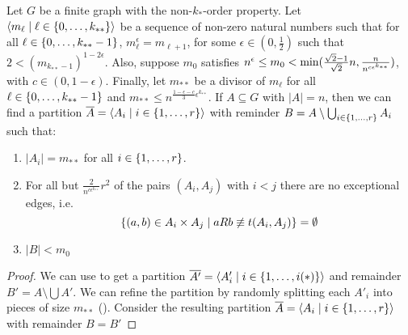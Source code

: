     \begin{lemma}[Claim 4.14] \label{lem:existance_of_equitative_partition_with_bound_exceptional_pairs}
        Let $G$ be a finite graph with the non-$k_{*}$-order property.
        Let $\left< m_\ell \mid \ell \in \{ 0, \dots, k_{**} \} \right>$ be a sequence of non-zero natural numbers such that
        for all $\ell \in \{ 0, \dots, k_{**}-1 \}$, $m_\ell^\epsilon = m_{\ell+1}$,
        for some $\epsilon \in (0, \frac{1}{2})$ such that $2 < (m_{k_{**}-1})^{1-2\epsilon}$.
        Also, suppose $m_0$ satisfies $n^\epsilon \leq m_0 < \min ( \frac{\sqrt{2}-1}{\sqrt{2}} n, \frac{n}{n^{c \epsilon^{k_{**}}}} )$,
        with $c \in (0, 1-\epsilon)$.
        Finally, let $m_{**}$ be a divisor of $m_\ell$ for all $\ell \in \{ 0, \dots, k_{**}-1 \}$ and
        $m_{**} \leq n^{\frac{1 - \epsilon - c}{3}\epsilon^{k_{**}}}$.
        If $A \subseteq G$ with $|A| = n$, then we can find a partition $\overline{A} = \left< A_i \mid i \in \{ 1, \dots, r \} \right>$
        with reminder $B = A \setminus \bigcup_{i \in \{ 1, \dots, r \}} A_i$ such that:
        \begin{enumerate}
            \item \label{itm:existance_of_equitative_partition_with_bound_exceptional_pairs.1} $|A_i| = m_{**}$ for all $i \in \{ 1, \dots, r \}$.
            \item \label{itm:existance_of_equitative_partition_with_bound_exceptional_pairs.2} For all but $\frac{2}{n^{c\epsilon^{k_{**}}}}r^2$ of the pairs
                $(A_i, A_j)$ with $i<j$ there are no exceptional edges, i.e.
                \[
                    \{ (a,b) \in A_i \times A_j \mid a R b \not\equiv t(A_i, A_j) \} = \emptyset
                \]
            \item \label{itm:existance_of_equitative_partition_with_bound_exceptional_pairs.3} $|B| < m_0$
        \end{enumerate}
        \begin{proof}
            We can use  to get a partition
            $\overline{A'} = \left< A'_i \mid i \in \{ 1, \dots, i(*) \} \right>$ and remainder $B' = A \setminus \bigcup A'$.
            We can refine the partition by randomly splitting each $A'_i$ into pieces of size $m_{**}$ ().
            Consider the resulting partition $\overline{A} = \left< A_i \mid i \in \{ 1, \dots, r \} \right>$ with remainder $B = B'$

\end{proof}
\end{lemma}
